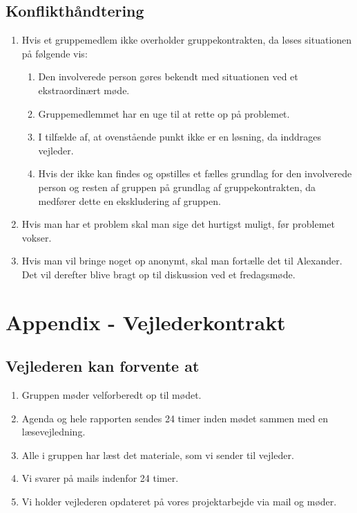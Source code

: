 \section{Konflikthåndtering}
\begin{enumerate}
\item Hvis et gruppemedlem ikke overholder gruppekontrakten, da løses situationen på følgende vis:
\begin{enumerate}
\item Den involverede person gøres bekendt med situationen ved et ekstraordinært møde.
\item Gruppemedlemmet har en uge til at rette op på problemet.
\item I tilfælde af, at ovenstående punkt ikke er en løsning, da inddrages vejleder.
\item Hvis der ikke kan findes og opstilles et fælles grundlag for den involverede person og resten af gruppen på grundlag af gruppekontrakten, da medfører dette en ekskludering af gruppen.
\end{enumerate}
\item Hvis man har et problem skal man sige det hurtigst muligt, før problemet vokser.
\item Hvis man vil bringe noget op anonymt, skal man fortælle det til Alexander. Det vil derefter blive bragt op til diskussion ved et fredagsmøde.
\end{enumerate}

\chapter{Appendix - Vejlederkontrakt}
\section{Vejlederen kan forvente at}
\begin{enumerate}
\item Gruppen møder velforberedt op til mødet.
\item Agenda og hele rapporten sendes 24 timer inden mødet sammen med en læsevejledning.
\item Alle i gruppen har læst det materiale, som vi sender til vejleder.
\item Vi svarer på mails indenfor 24 timer.
\item Vi holder vejlederen opdateret på vores projektarbejde via mail og møder.
\end{enumerate}

